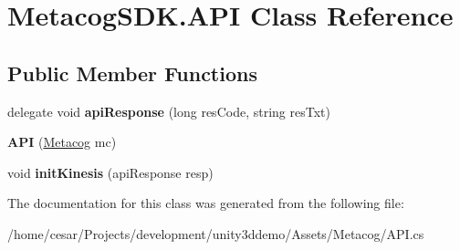 \hypertarget{classMetacogSDK_1_1API}{}\section{Metacog\+S\+D\+K.\+A\+PI Class Reference}
\label{classMetacogSDK_1_1API}
\subsection*{Public Member Functions}
\begin{DoxyCompactItemize}
\item 
delegate void {\bfseries api\+Response} (long res\+Code, string res\+Txt)\hypertarget{classMetacogSDK_1_1API_a32f228252de73a7e47dffd674c9c7184}{}\label{classMetacogSDK_1_1API_a32f228252de73a7e47dffd674c9c7184}

\item 
{\bfseries A\+PI} (\hyperlink{classMetacogSDK_1_1Metacog}{Metacog} mc)\hypertarget{classMetacogSDK_1_1API_a4de3d5a351dc955c280febc2aed43c02}{}\label{classMetacogSDK_1_1API_a4de3d5a351dc955c280febc2aed43c02}

\item 
void {\bfseries init\+Kinesis} (api\+Response resp)\hypertarget{classMetacogSDK_1_1API_a8ca2987250fe76524ec9e959676dc237}{}\label{classMetacogSDK_1_1API_a8ca2987250fe76524ec9e959676dc237}

\end{DoxyCompactItemize}


The documentation for this class was generated from the following file\+:\begin{DoxyCompactItemize}
\item 
/home/cesar/\+Projects/development/unity3ddemo/\+Assets/\+Metacog/A\+P\+I.\+cs\end{DoxyCompactItemize}
